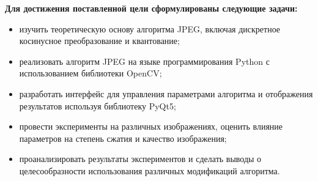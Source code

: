 \textbf{Для достижения поставленной цели сформулированы следующие задачи:}

\begin{itemize}[label=--]
    \item изучить теоретическую основу алгоритма JPEG, включая дискретное косинусное преобразование и квантование;
    \item реализовать алгоритм JPEG на языке программирования Python с использованием библиотеки OpenCV;
    \item разработать интерфейс для управления параметрами алгоритма и отображения результатов используя библиотеку PyQt5;
    \item провести эксперименты на различных изображениях, оценить влияние параметров на степень сжатия и качество изображения;
    \item проанализировать результаты экспериментов и сделать выводы о целесообразности использования различных модификаций алгоритма.
\end{itemize}
